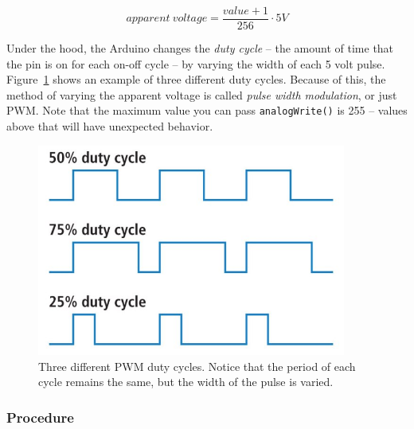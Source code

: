 \documentclass[11pt]{article} %
\begin{document}
\begin{equation}
apparent\ voltage = \frac{value+1}{256}\cdot 5 V
\end{equation}

Under the hood, the Arduino changes the \emph{duty cycle} -- the amount of time that the pin is on for each on-off cycle -- by varying the width of each 5 volt pulse. Figure~\ref{fig:pwm} shows an example of three different duty cycles. Because of this, the method of varying the apparent voltage is called \emph{pulse width modulation}, or just PWM. Note that the maximum value you can pass \verb|analogWrite()| is 255 -- values above that will have unexpected behavior.

\begin{figure}[htbp]
\begin{center}
\includegraphics[width=4in]{figures/pwm.jpg}
\caption{Three different PWM duty cycles. Notice that the period of each cycle remains the same, but the width of the pulse is varied.}
\label{fig:pwm}
\end{center}
\end{figure}

\subsubsection*{Procedure}
\end{document}
